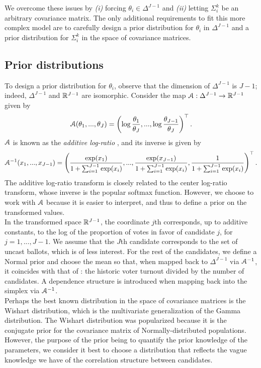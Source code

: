 \documentclass{article}
\begin{document}
We overcome these issues by \textit{(i)} forcing $\theta_i \in \Delta^{J-1}$ and \textit{(ii)} letting $\Sigma_i^k$ be an arbitrary covariance matrix. The only additional requirements to fit this more complex model are to carefully design a prior distribution for $\theta_i$ in $\Delta^{J-1}$ and a prior distribution for $\Sigma_i^k$ in the space of covariance matrices.


\subsection{Prior distributions}


To design a prior distribution for $\theta_i$, observe that the dimension of $\Delta^{J-1}$ is $J-1$; indeed, $\Delta^{J-1}$ and $\mathbb{R}^{J-1}$ are isomorphic. Consider the map $\mathcal{A}: \Delta^{J-1} \to \mathbb{R}^{J-1}$ given by
\[
  \mathcal{A} (\theta_1, ..., \theta_J) = \left( \log \frac{\theta_1}{\theta_J}, ..., \log \frac{\theta_{J-1}}{\theta_J} \right)^\top.
\]
$\mathcal{A}$ is known as the \textit{additive log-ratio} \citep{aitchison1982}, and its inverse is given by
\[
  \mathcal{A}^{-1} (x_1, ..., x_{J-1}) = \left( \frac{\exp(x_1)}{1 + \sum_{i=1}^{J-1} \exp(x_i)}, ..., \frac{\exp(x_{J-1})}{1 + \sum_{i=1}^{J-1} \exp(x_i)}, \frac{1}{1 + \sum_{i=1}^{J-1} \exp(x_i)} \right)^\top.
\]
The additive log-ratio transform is closely related to the center log-ratio transform, whose inverse is the popular softmax function. However, we choose to work with $\mathcal{A}$ because it is easier to interpret, and thus to define a prior on the transformed values. \\

In the transformed space $\mathbb{R}^{J-1}$, the coordinate $j$th corresponds, up to additive constants, to the log of the proportion of votes in favor of candidate $j$, for $j=1, ..., J-1$. We assume that the $J$th candidate corresponds to the set of uncast ballots, which is of less interest. For the rest of the candidates, we define a Normal prior and choose the mean so that, when mapped back to $\Delta^{J-1}$ via $\mathcal{A}^{-1}$, it coincides with that of \citet{diluvi2018}: the historic voter turnout divided by the number of candidates. A dependence structure is introduced when mapping back into the simplex via $\mathcal{A}^{-1}$.
\\


Perhaps the best known distribution in the space of covariance matrices is the Wishart distribution, which is the multivariate generalization of the Gamma distribution. The Wishart distribution was popularized because it is the conjugate prior for the covariance matrix of Normally-distributed populations. However, the purpose of the prior being to quantify the prior knowledge of the parameters, we consider it best to choose a distribution that reflects the vague knowledge we have of the correlation structure between candidates.
\\
\end{document}
